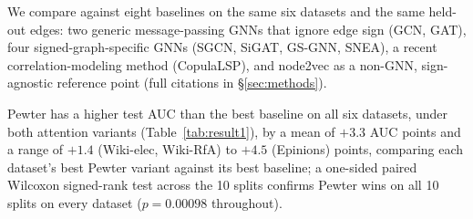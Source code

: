 \documentclass[sigconf, review, anonymous]{acmart}
\theoremstyle{plain}
\theoremstyle{definition}
\begin{document}
We compare against eight baselines on the same six datasets and the same held-out edges: two generic message-passing GNNs that ignore edge sign (GCN, GAT), four signed-graph-specific GNNs (SGCN, SiGAT, GS-GNN, SNEA), a recent correlation-modeling method (CopulaLSP), and node2vec as a non-GNN, sign-agnostic reference point (full citations in \S\ref{sec:methods}).

Pewter has a higher test AUC than the best baseline on all six datasets, under both attention variants (Table~\ref{tab:result1}), by a mean of $+3.3$ AUC points and a range of $+1.4$ (Wiki-elec, Wiki-RfA) to $+4.5$ (Epinions) points, comparing each dataset's best Pewter variant against its best baseline; a one-sided paired Wilcoxon signed-rank test across the 10 splits confirms Pewter wins on all 10 splits on every dataset ($p=0.00098$ throughout).
\end{document}
